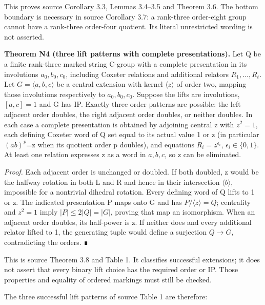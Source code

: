 This proves source Corollary 3.3, Lemmas 3.4--3.5 and Theorem 3.6. The bottom boundary is necessary in source Corollary 3.7: a rank-three order-eight group cannot have a rank-three order-four quotient. Its literal unrestricted wording is not asserted.

\textbf{Theorem N4 (three lift patterns with complete presentations).} Let Q be a finite rank-three marked string C-group with a complete presentation in its involutions \(a_{0},b_{0},c_{0}\), including Coxeter relations and additional relators \(R_{1},\ldots,R_{t}\). Let \(G=\langle a,b,c\rangle\) be a central extension with kernel \(\langle z\rangle\) of order two, mapping those involutions respectively to \(a_{0},b_{0},c_{0}\). Suppose the lifts are involutions, \([a,c]=1\) and G has IP. Exactly three order patterns are possible: the left adjacent order doubles, the right adjacent order doubles, or neither doubles. In each case a complete presentation is obtained by adjoining central z with \(z^{2}=1\), each defining Coxeter word of Q set equal to its actual value 1 or z (in particular \((ab)^{p}\)=z when its quotient order p doubles), and equations \(R_{i}=\)\(z^{\epsilon _i}\), \(\epsilon _{i}\in \{0,1\}\). At least one relation expresses z as a word in \(a,b,c\), so z can be eliminated.

\emph{Proof.} Each adjacent order is unchanged or doubled. If both doubled, z would be the halfway rotation in both L and R and hence in their intersection \(\langle b\rangle\), impossible for a nontrivial dihedral rotation. Every defining word of Q lifts to 1 or z. The indicated presentation P maps onto G and has \(P/\langle z\rangle=Q\); centrality and \(z^{2}=1\) imply \(|P|\le 2|Q|=|G|\), proving that map an isomorphism. When an adjacent order doubles, its half-power is z. If neither does and every additional relator lifted to 1, the generating tuple would define a surjection \(Q\to G\), contradicting the orders. ∎

This is source Theorem 3.8 and Table 1. It classifies successful extensions; it does not assert that every binary lift choice has the required order or IP. Those properties and equality of ordered markings must still be checked.

The three successful lift patterns of source Table 1 are therefore:

